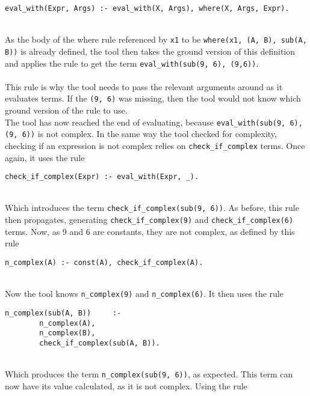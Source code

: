 \begin{lstlisting}[firstnumber=133]
eval_with(Expr, Args) :- eval_with(X, Args), where(X, Args, Expr).
\end{lstlisting}
\mbox{} \\
As the body of the where rule referenced by \lstinline{x1} to be \lstinline{where(x1, (A, B), sub(A, B))} is already defined, the tool then takes the ground version of this definition and applies the rule to get the term \lstinline{eval_with(sub(9, 6), (9,6))}. \\ \\%
This rule is why the tool needs to pass the relevant arguments around as it evaluates terms. If the \lstinline{(9, 6)} was missing, then the tool would not know which ground version of the rule to use.\\ %
The tool has now reached the end of evaluating, because \lstinline{eval_with(sub(9, 6), (9, 6))} is not complex. In the same way the tool checked for complexity, checking if an expression is not complex relies on \lstinline{check_if_complex} terms. Once again, it uses the rule\\

\begin{lstlisting}[firstnumber=149]
check_if_complex(Expr) :- eval_with(Expr, _).
\end{lstlisting}
\mbox{} \\
Which introduces the term \lstinline{check_if_complex(sub(9, 6))}. As before, this rule then propagates, generating \lstinline{check_if_complex(9)} and \lstinline{check_if_complex(6)} terms. Now, as 9 and 6 are constants, they are not complex, as defined by this rule \\ %

\begin{lstlisting}[firstnumber=172]
n_complex(A) :- const(A), check_if_complex(A).
\end{lstlisting}
\mbox{} \\
Now the tool knows \lstinline{n_complex(9)} and \lstinline{n_complex(6)}. It then uses the rule \\ %

\begin{lstlisting}[firstnumber=181]
n_complex(sub(A, B))     :- 
		n_complex(A), 
		n_complex(B), 
		check_if_complex(sub(A, B)).
\end{lstlisting}
\mbox{} \\
Which produces the term \lstinline{n_complex(sub(9, 6))}, as expected. This term can now have its value calculated, as it is not complex. Using the rule \\ %

